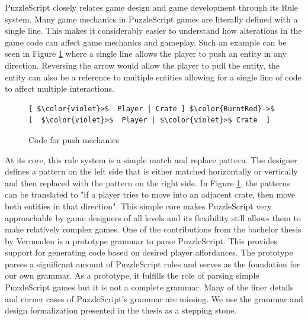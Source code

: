 PuzzleScript closely relates game design and game development through its Rule system. Many game mechanics in PuzzleScript games are literally defined with a single line. This makes it considerably easier to understand how alterations in the game code can affect game mechanics and gameplay. Such an example can be seen in Figure \ref{fig:push_mechanic} where a single line allows the player to push an entity in any direction. Reversing the arrow would allow the player to pull the entity, the entity can also be a reference to multiple entities allowing for a single line of code to affect multiple interactions. 

\begin{figure}
    \centering
    \begin{lstlisting}[language=PuzzleScript]
        [ $\color{violet}>$  Player | Crate ] $\color{BurntRed}->$ [  $\color{violet}>$  Player | $\color{violet}>$ Crate  ]
    \end{lstlisting}
    \caption{Code for push mechanics}
    \label{fig:push_mechanic}
\end{figure}

At its core, this rule system is a simple match and replace pattern. The designer defines a pattern on the left side that is either matched horizontally or vertically and then replaced with the pattern on the right side. In Figure \ref{fig:push_mechanic}, the patterns can be translated to "if a player tries to move into an adjacent crate, then move both entities in that direction". This simple core makes PuzzleScript very approachable by game designers of all levels and its flexibility still allows them to make relatively complex games. One of the contributions from the bachelor thesis by Vermeulen\cite{vermeulenautomated} is a prototype grammar to parse PuzzleScript. This provides support for generating code based on desired player affordances. The prototype parses a significant amount of PuzzleScript rules and serves as the foundation for our own grammar. As a prototype, it fulfills the role of parsing simple PuzzleScript games but it is not a complete grammar. Many of the finer details and corner cases of PuzzleScript's grammar are missing. We use the grammar and design formalization presented in the thesis as a stepping stone.



